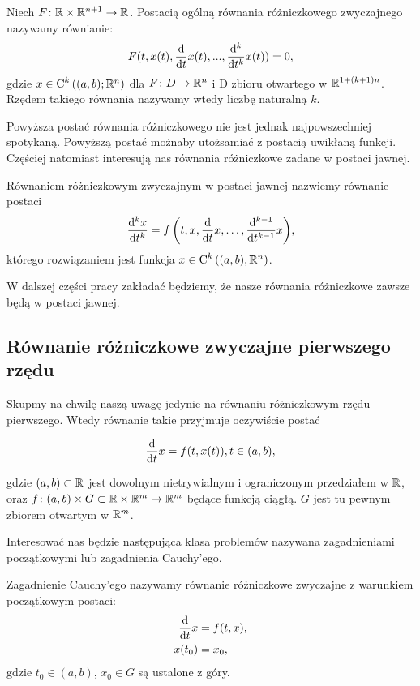 \documentclass[12pt,a4paper]{report}
\begin{document}
\begin{definition} 
Niech $F \colon \setR \times \setR^{n+1} \to \setR$. Postacią ogólną równania różniczkowego zwyczajnego nazywamy równianie: 
\begin{equation*}
F(t, x(t), \ddx{t} x(t),..., \ddx[^k]{t^k} x(t) ) = 0,
\end{equation*}
gdzie $x \in \Ck{k}{(a,b); \setR^n}$ dla $F \colon D \to \setR^n$ i D zbioru otwartego w $\setR^{1+(k+1)n}$. 
Rzędem takiego równania nazywamy wtedy liczbę naturalną $k$. 
\end{definition}

Powyższa postać równania różniczkowego nie jest jednak najpowszechniej spotykaną. Powyższą postać możnaby utożsamiać z postacią uwikłaną funkcji. Częściej natomiast interesują nas równania różniczkowe zadane w postaci jawnej.

\begin{definition}
Równaniem różniczkowym zwyczajnym w postaci jawnej nazwiemy równanie postaci
$$
\ddx[{^k x}]{t^k} = \function{f}{t,x,\ddx{t}x, \ldots, \ddx[{^{k-1}}]{t^{k-1}} x},
$$
którego rozwiązaniem jest funkcja $x \in \Ck{k}{(a,b), \setR^n}$.
\end{definition}

W dalszej części pracy zakładać będziemy, że nasze równania różniczkowe zawsze będą w postaci jawnej.


\subsection{Równanie różniczkowe zwyczajne pierwszego rzędu}

Skupmy na chwilę naszą uwagę jedynie na równaniu różniczkowym rzędu pierwszego. Wtedy równanie takie przyjmuje oczywiście postać 

$$
\ddx{t}x = f(t,x(t)), t \in (a,b) ,
$$ 

gdzie $(a,b) \subset \setR$ jest dowolnym nietrywialnym i ograniczonym przedziałem w $\setR$, oraz $ f \colon (a,b) \times G \subset \setR \times \setR^m \to \setR^m$ będące funkcją ciągłą. $G$ jest tu pewnym zbiorem otwartym w $\setR^m$. 

Interesować nas będzie następująca klasa problemów nazywana zagadnieniami początkowymi lub zagadnienia Cauchy'ego.

\begin{problem} \label{prob-zagadnienie-cauchy}
Zagadnienie Cauchy'ego nazywamy równanie różniczkowe zwyczajne z warunkiem początkowym postaci:
\begin{align*}
\ddx{t} x &= f(t,x), \\
x(t_0) &= x_0,
\end{align*}
gdzie $t_0 \in (a,b)$, $x_0 \in G$ są ustalone z góry. 
\end{problem}
\end{document}

